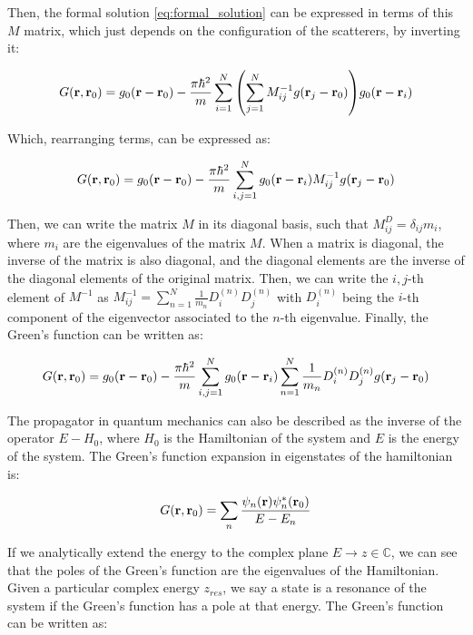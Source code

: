 Then, the formal solution \cref{eq:formal_solution} can be expressed in terms of this $M$ matrix, which just depends on the configuration of the scatterers, by inverting it:

\begin{equation}
    G(\vb{r},\vb{r}_0)=g_0(\vb{r}-\vb{r}_0)-\frac{\pi\hbar^2}{m}\sum_{i=1}^N \qty(\sum_{j=1}^N M_{ij}^{-1}g(\vb{r}_j-\vb{r}_0)) g_0(\vb{r}-\vb{r}_i)
\end{equation}

Which, rearranging terms, can be expressed as:

\begin{equation}
    G(\vb{r},\vb{r}_0)=g_0(\vb{r}-\vb{r}_0)-\frac{\pi\hbar^2}{m}\sum_{i,j=1}^N g_0(\vb{r}-\vb{r}_i) M_{ij}^{-1}g(\vb{r}_j-\vb{r}_0)
\end{equation}

Then, we can write the matrix $M$ in its diagonal basis, such that $M^D_{ij}=\delta_{ij}m_i$, where $m_i$ are the eigenvalues of the matrix $M$. When a matrix is diagonal, the inverse of the matrix is also diagonal, and the diagonal elements are the inverse of the diagonal elements of the original matrix. Then, we can write the $i,j$-th element of $M^{-1}$ as $M_{ij}^{-1}=\sum _{n=1}^N\frac{1}{m_n}D_i^{(n)}D_j^{(n)}$ with $D_i^{(n)}$ being the $i$-th component of the eigenvector associated to the $n$-th eigenvalue. Finally, the Green's function can be written as:

\begin{equation}
    G(\vb{r},\vb{r}_0)=g_0(\vb{r}-\vb{r}_0)-\frac{\pi\hbar^2}{m}\sum_{i,j=1}^N g_0(\vb{r}-\vb{r}_i) \sum _{n=1}^N\frac{1}{m_n}D_i^{(n)}D_j^{(n)} g(\vb{r}_j-\vb{r}_0)
    \label{eq:final_gf}
\end{equation}

The propagator in quantum mechanics can also be described as the inverse of the operator $E-H_0$, where $H_0$ is the Hamiltonian of the system and $E$ is the energy of the system. The Green's function expansion in eigenstates of the hamiltonian is:

\begin{equation}
    G(\vb{r},\vb{r}_0)=\sum_n \frac{\psi_n(\vb{r})\psi_n^*(\vb{r}_0)}{E-E_n}
\end{equation}

If we analytically extend the energy to the complex plane $E\to z\in \mathbb C$, we can see that the poles of the Green's function are the eigenvalues of the Hamiltonian. Given a particular complex energy $z_{res}$, we say a state is a resonance of the system if the Green's function has a pole at that energy. The Green's function can be written as:

